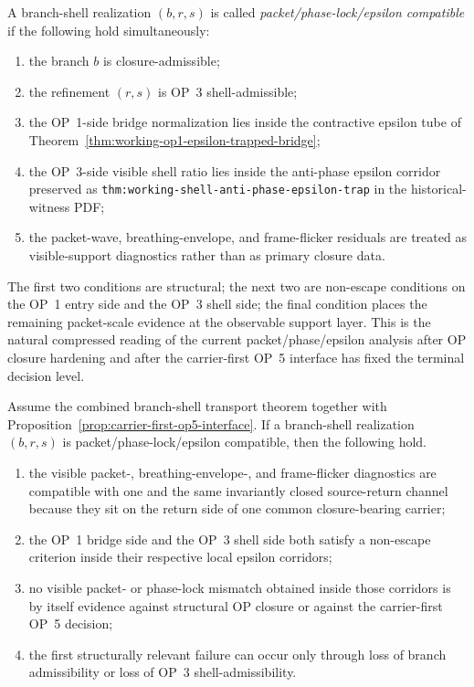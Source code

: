\begin{definition}
A branch-shell realization $(b,r,s)$ is called \emph{packet/phase-lock/epsilon compatible} if the following hold simultaneously:
\begin{enumerate}[leftmargin=2em,label=(\roman*)]
\item the branch $b$ is closure-admissible;
\item the refinement $(r,s)$ is OP~3 shell-admissible;
\item the OP~1-side bridge normalization lies inside the contractive epsilon tube of Theorem~\ref{thm:working-op1-epsilon-trapped-bridge};
\item the OP~3-side visible shell ratio lies inside the anti-phase epsilon corridor preserved as \texttt{thm:working-shell-anti-phase-epsilon-trap} in the historical-witness PDF;
\item the packet-wave, breathing-envelope, and frame-flicker residuals are treated as visible-support diagnostics rather than as primary closure data.
\end{enumerate}
\end{definition}

\begin{remark}
The first two conditions are structural; the next two are non-escape conditions on the OP~1 entry side and the OP~3 shell side; the final condition places the remaining packet-scale evidence at the observable support layer. This is the natural compressed reading of the current packet/phase/epsilon analysis after OP closure hardening and after the carrier-first OP~5 interface has fixed the terminal decision level.
\end{remark}

\begin{corollary}
\label{cor:packet-phase-epsilon-compatibility}
Assume the combined branch-shell transport theorem together with Proposition~\ref{prop:carrier-first-op5-interface}. If a branch-shell realization $(b,r,s)$ is packet/phase-lock/epsilon compatible, then the following hold.
\begin{enumerate}[leftmargin=2em,label=(\roman*)]
\item the visible packet-, breathing-envelope-, and frame-flicker diagnostics are compatible with one and the same invariantly closed source-return channel because they sit on the return side of one common closure-bearing carrier;
\item the OP~1 bridge side and the OP~3 shell side both satisfy a non-escape criterion inside their respective local epsilon corridors;
\item no visible packet- or phase-lock mismatch obtained inside those corridors is by itself evidence against structural OP closure or against the carrier-first OP~5 decision;
\item the first structurally relevant failure can occur only through loss of branch admissibility or loss of OP~3 shell-admissibility.
\end{enumerate}
\end{corollary}

